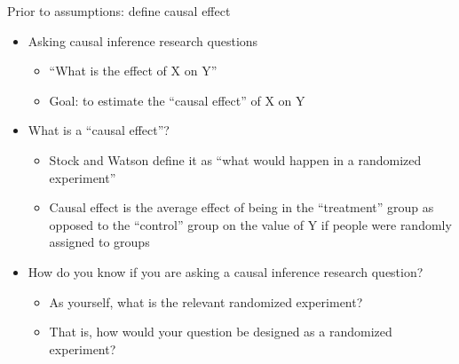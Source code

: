 \documentclass[
  8pt,
  ignorenonframetext,
  dvipsnames]{beamer}
\providecommand{\tightlist}{%
  \setlength{\itemsep}{0pt}\setlength{\parskip}{0pt}}
\let\olditem\item
\renewcommand{\item}{%
  \olditem\vspace{4pt}
}
\begin{document}
\begin{frame}{Prior to assumptions: define causal effect}
\protect\hypertarget{prior-to-assumptions-define-causal-effect}{}

\begin{itemize}
\tightlist
\item
  Asking causal inference research questions

  \begin{itemize}
  \tightlist
  \item
    ``What is the effect of X on Y''
  \item
    Goal: to estimate the ``causal effect'' of X on Y
  \end{itemize}
\end{itemize}

\medskip

\begin{itemize}
\tightlist
\item
  What is a ``causal effect''?

  \begin{itemize}
  \tightlist
  \item
    Stock and Watson define it as ``what would happen in a randomized
    experiment''
  \item
    Causal effect is the average effect of being in the ``treatment''
    group as opposed to the ``control'' group on the value of Y if
    people were randomly assigned to groups
  \end{itemize}
\end{itemize}

\medskip

\begin{itemize}
\tightlist
\item
  How do you know if you are asking a causal inference research
  question?

  \begin{itemize}
  \tightlist
  \item
    As yourself, what is the relevant randomized experiment?
  \item
    That is, how would your question be designed as a randomized
    experiment?
  \end{itemize}
\end{itemize}

\end{frame}
\end{document}
